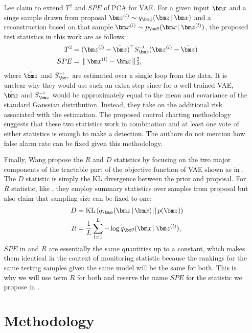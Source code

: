 \documentclass{scrartcl}
\theoremstyle{definition}
\let\ref\Cref
\begin{document}
Lee \etal \parencite{lee2019process} claim to extend $T^2$ and $SPE$ of PCA for VAE.
For a given input $\mbx$ and a singe sample drawn from proposal $\mbz^{(l)} \sim \encoding$ and a reconstruction based on that sample $\mbx^{(l)} \sim p_{\mbtheta}(\mbx \g \mbz^{(l)})$, the proposed test statistics in this work are as follows:
\begin{equation}
\begin{aligned}
    T^{2} &= (\mbz^{(l)} - \bar{\mbz})^{\top}S_{\mbz}\inv(\mbz^{(l)} - \bar{\mbz}) \\
    SPE &= \gg \mbx^{(l)} - \mbx \gg_{2}^{2},
\end{aligned}
\end{equation}
where $\bar{\mbz}$ and $S_{\mbz}\inv$ are estimated over a single loop from the data. It is unclear why they would use such an extra step since for a well trained VAE, $\bar{\mbz}$ and $S_{\mbz}\inv$ would be approximately equal to the mean and covariance of the standard Gaussian distribution.
Instead, they take on the additional risk associated with the estimation.
The proposed control charting methodology suggests that these two statistics work in combination and at least one vote of either statistics is enough to make a detection.
The authors do not mention how false alarm rate can be fixed given this methodology.

Finally, Wang \etal propose the $R$ and $D$ statistics by focusing on the two major components of the tractable part of the objective function of VAE shown as in \ref{eqn:VAELoss}.
The $D$ statistic is simply the KL divergence between the prior and proposal.
For $R$ statistic, like \parencite{lee2019process}, they employ summary statistics over samples from proposal but also claim that sampling size can be fixed to one:
\begin{equation}
\begin{aligned}
    D &= \KL{\encoding}{p(\mbz)} \\
    R &= \frac{1}{L} \sum_{l=1}^{L} -\log q_{\mbtheta}(\mbx \g \mbz^{(l)}),
\end{aligned}
\label{eq: DR}
\end{equation}
$SPE$ in and $R$ are essentially the same quantities up to a constant, which makes them identical in the context of monitoring statistic because the rankings for the same testing samples given the same model will be the same for both.
This is why we will use term $R$ for both and reserve the name $SPE$ for the statistic we propose in \ref{sec:methodology}.
\section{Methodology}
\label{sec:methodology}
\end{document}

